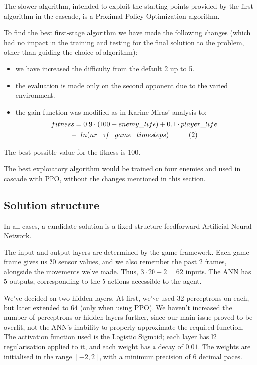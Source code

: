 \documentclass[conference]{IEEEtran}
\begin{document}
    The slower algorithm, intended to exploit the starting points provided by the first algorithm in the cascade, is a Proximal Policy Optimization\cite{ppo} algorithm. 

    To find the best first-stage algorithm we have made the following changes (which had no impact in the training and testing for the final solution to the problem, other than guiding the choice of algorithm):
    \begin{itemize}
        \item we have increased the difficulty from the default 2 up to 5.
        \item the evaluation is made only on the second opponent due to the varied environment.
        \item the gain function was modified as in Karine Miras' analysis\cite{evoman_blog} to:
        \begin{gather*}
          fitness = 
            0.9 \cdot (100 - enemy\_life) + 0.1 \cdot player\_life\\
            -\hspace{0.2cm} ln(nr\_of\_game\_timesteps) \hspace{1cm} (2)
        \end{gather*}
    \end{itemize}

    The best possible value for the fitness is $100$.

    The best exploratory algorithm would be trained on four enemies and
    used in cascade with PPO, without the changes mentioned in this section.

    \subsection{Solution structure}
    In all cases, a candidate solution is a fixed-structure feedforward Artificial Neural Network.

    The input and output layers are determined by the game framework. Each game frame gives us $20$ sensor values, and we also remember the past $2$ frames, alongside the movements we've made. Thus, $3 \cdot 20 + 2 = 62$ inputs. The ANN has $5$ outputs, corresponding to the $5$ actions accessible to the agent.

    We've decided on two hidden layers. At first, we've used $32$ perceptrons on each, but later extended to $64$ (only when using PPO). We haven't increased the number of perceptrons or hidden layers further, since our main issue proved to be overfit, not the ANN's inability to properly approximate the required function\cite{cybenko}.
    The activation function used is the Logistic Sigmoid; each layer has l2 regularisation applied to it, and each weight has a decay of $0.01$.
    The weights are initialised in the range $[-2, 2]$, with a minimum precision of $6$ decimal paces.
    
\end{document}
